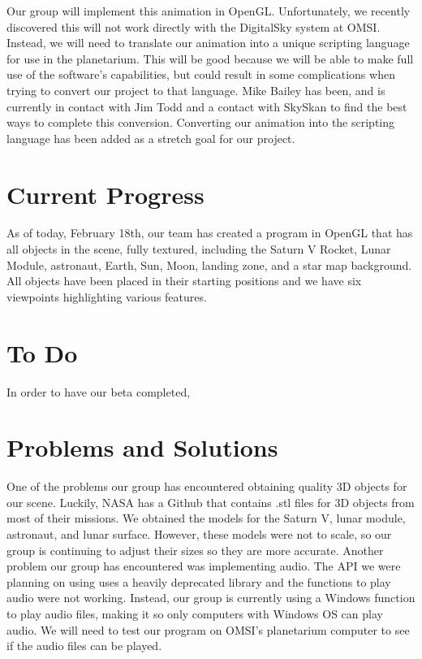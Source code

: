 \documentclass[onecolumn, draftclsnofoot,10pt, compsoc]{IEEEtran}
\begin{document}
Our group will implement this animation in OpenGL. Unfortunately, we recently discovered this will not work directly with the DigitalSky system at OMSI. Instead, we will need to translate our animation into a unique scripting language for use in the planetarium. This will be good because we will be able to make full use of the software's capabilities, but could result in some complications when trying to convert our project to that language. Mike Bailey has been, and is currently in contact with Jim Todd and a contact with SkySkan to find the best ways to complete this conversion. Converting our animation into the scripting language has been added as a stretch goal for our project.

\section{Current Progress}
As of today, February 18th, our team has created a program in OpenGL that has all objects in the scene, fully textured, including the Saturn V Rocket, Lunar Module, astronaut, Earth, Sun, Moon, landing zone, and a star map background. All objects have been placed in their starting positions and we have six viewpoints highlighting various features.

\section{To Do}
In order to have our beta completed, 





\section{Problems and Solutions}
One of the problems our group has encountered obtaining quality 3D objects for our scene. Luckily, NASA has a Github that contains .stl files for 3D objects from most of their missions. We obtained the models for the Saturn V, lunar module, astronaut, and lunar surface. However, these models were not to scale, so our group is continuing to adjust their sizes so they are more accurate. Another problem our group has encountered was implementing audio. The API we were planning on using uses a heavily deprecated library and the functions to play audio were not working. Instead, our group is currently using a Windows function to play audio files, making it so only computers with Windows OS can play audio. We will need to test our program on OMSI's planetarium computer to see if the audio files can be played. 
\end{document}
